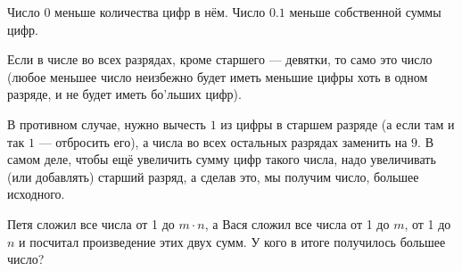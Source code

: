 \begin{itemize}
\itA Число $0$ меньше количества цифр в нём. Число $0.1$ меньше собственной суммы цифр.

\itB Если в числе во всех разрядах, кроме старшего --- девятки, то само это число 
(любое меньшее число неизбежно будет иметь меньшие цифры хоть в одном 
разряде, и не будет иметь бо'льших цифр).

В противном случае, нужно вычесть $1$ из цифры в старшем разряде (а если там и так
$1$ --- отбросить его), а числа во всех остальных разрядах заменить на $9$. 
В самом деле, чтобы ещё увеличить сумму цифр такого числа, надо увеличивать (или добавлять)
старший разряд, а сделав это, мы получим число, большее исходного.

\itC Петя сложил все числа от 1 до $m \cdot n$, а Вася сложил все числа от 1 до $m$, 
от 1 до $n$ и посчитал произведение этих двух сумм. У кого в итоге получилось большее число?


 


\end{itemize}